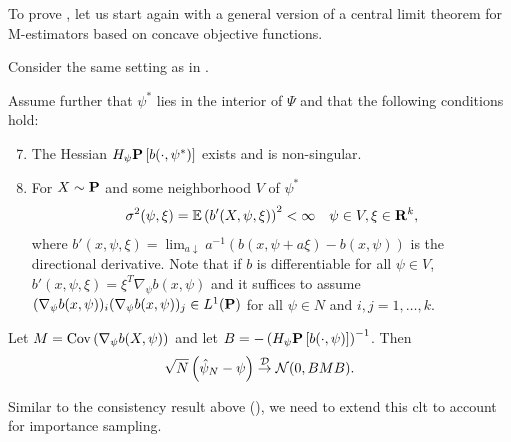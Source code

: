 To prove , let us start again with a general version of a central limit theorem for M-estimators based on concave objective functions. 
\begin{theorem}
    \label{thm:haberman-clt}
    Consider the same setting as in . 

    Assume further that $\psi^{\ast}$ lies in the interior of $\Psi$ and that the following conditions hold: 
    \begin{enumerate}[label=(C\arabic*),ref=(C\arabic*)]
        \setcounter{enumi}{6}
        \item\label{it:C7} The Hessian $H_{\psi} \P \left[ b(\cdot, \psi^{\ast}) \right]$ exists and is non-singular.
        \setcounter{enumi}{9}
        \item\label{it:C10} For $X\sim \P$ and some neighborhood $V$ of $\psi^{\ast}$ 
        \begin{align*}
            \sigma^{2}(\psi, \xi) = \mathbb E \left( b'(X, \psi, \xi)  \right)^{2} < \infty && \psi \in V, \xi \in \R^{k},
        \end{align*}
        where $b'(x, \psi, \xi) = \lim_{a \downarrow} a^{-1} \left( b(x, \psi + a\xi) - b(x, \psi)\right)$ is the directional derivative. Note that if $b$ is differentiable for all $\psi \in V$, $b'(x, \psi, \xi) = \xi^{T}\nabla_{\psi} b(x, \psi)$ and it suffices to assume $(\nabla_{\psi} b(x,\psi))_{i}(\nabla_{\psi} b(x,\psi))_{j} \in L^{1} (\P)$ for all $\psi \in N$ and $i,j = 1,\dots, k$.
    \end{enumerate}
    
    Let $M = \cov \left( \nabla_{\psi} b(X, \psi) \right)$ and let $B = - \left(H_{\psi} \P \left[ b(\cdot, \psi) \right]\right)^{-1}$. Then 
    \begin{equation}
        \sqrt{N} \left( \hat\psi_{N} - \psi \right) \convD \Normal (0, BMB).
    \end{equation}
    
\end{theorem}

Similar to the consistency result above (), we need to extend this \acrshort{clt} to account for importance sampling.

